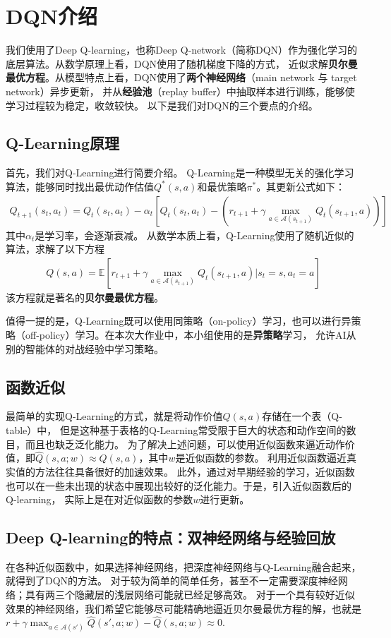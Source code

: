 \documentclass[10pt]{article}
\begin{document}
\section{DQN介绍}
我们使用了Deep Q-learning，也称Deep Q-network（简称DQN）作为强化学习的底层算法。从数学原理上看，DQN使用了随机梯度下降的方式，
近似求解\textbf{贝尔曼最优方程}。从模型特点上看，DQN使用了\textbf{两个神经网络}（main network 与 target network）异步更新，
并从\textbf{经验池}（replay buffer）中抽取样本进行训练，能够使学习过程较为稳定，收敛较快。
以下是我们对DQN的三个要点的介绍。

\subsection{Q-Learning原理}
首先，我们对Q-Learning进行简要介绍。
Q-Learning是一种模型无关的强化学习算法，能够同时找出最优动作估值$Q^*(s,a)$和最优策略$\pi^*$。其更新公式如下：
\begin{align}
Q_{t+1}(s_t,a_t) = Q_{t}(s_t,a_t) - \alpha_t \left[ Q_t(s_t,a_t) - \left(r_{t+1} + \gamma \mathop{\max}_{a\in \mathcal{A}(s_{t+1})} Q_t(s_{t+1},a) \right)  \right]	
\end{align}
其中$\alpha_t$是学习率，会逐渐衰减。
从数学本质上看，Q-Learning使用了随机近似的算法，求解了以下方程
\begin{align}
	Q(s,a) = \mathbb{E}\left[ r_{t+1} + \gamma \mathop{\max}_{a\in \mathcal{A}(s_{t+1})} Q_t(s_{t+1},a) \Big| s_t=s,a_t=a \right]
\end{align}
该方程就是著名的\textbf{贝尔曼最优方程}。

值得一提的是，Q-Learning既可以使用同策略（on-policy）学习，也可以进行异策略（off-policy）学习。在本次大作业中，本小组使用的是\textbf{异策略}学习，
允许AI从别的智能体的对战经验中学习策略。

\subsection{函数近似}
最简单的实现Q-Learning的方式，就是将动作价值$Q(s,a)$存储在一个表（Q-table）中，
但是这种基于表格的Q-Learning常受限于巨大的状态和动作空间的数目，而且也缺乏泛化能力。
为了解决上述问题，可以使用近似函数来逼近动作价值，即$\hat{Q}(s,a;w)\approx Q(s,a)$，其中$w$是近似函数的参数。
利用近似函数逼近真实值的方法往往具备很好的加速效果。
此外，通过对早期经验的学习，近似函数也可以在一些未出现的状态中展现出较好的泛化能力。于是，引入近似函数后的Q-learning，
实际上是在对近似函数的参数$w$进行更新。

\subsection{Deep Q-learning的特点：双神经网络与经验回放}
在各种近似函数中，如果选择神经网络，把深度神经网络与Q-Learning融合起来，就得到了DQN的方法。
对于较为简单的简单任务，甚至不一定需要深度神经网络；具有两三个隐藏层的浅层网络可能就已经足够高效。
对于一个具有较好近似效果的神经网络，我们希望它能够尽可能精确地逼近贝尔曼最优方程的解，也就是
$r + \gamma \mathop{\max}_{a\in \mathcal{A}(s')}\hat{Q}(s',a;w)-\hat{Q}(s,a;w)\approx 0$.  
\end{document}
